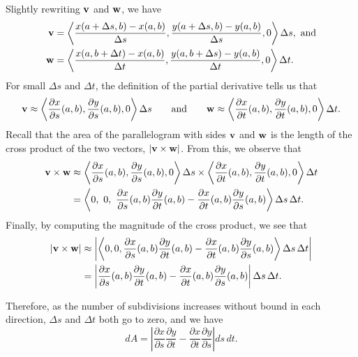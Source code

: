 Slightly rewriting $\mathbf{v}$ and $\mathbf{w}$, we have 
\begin{align*}
\vv &= \left\langle \frac{x(a+ \Delta s, b) - x(a,b)}{\Delta s}, \frac{y(a+ \Delta s, b) - y(a,b)}{\Delta s}, 0 \right\rangle \Delta s, \ \mbox{and} \\
\vw &= \left\langle \frac{x(a, b+ \Delta t) - x(a,b)}{\Delta t}, \frac{y(a, b+ \Delta s) - y(a,b)}{\Delta t}, 0 \right\rangle \Delta t.
\end{align*}
For small $\Delta s$ and $\Delta t$, the definition of the partial derivative tells us that
\[\mathbf{v} \approx \left\langle \frac{\partial x}{\partial s}(a,b), \frac{\partial y}{\partial s}(a,b), 0 \right\rangle \Delta s \ \ \ \ \ \text{ and } \ \ \ \ \  \mathbf{w} \approx \left\langle \frac{\partial x}{\partial t}(a,b), \frac{\partial y}{\partial t}(a,b), 0 \right\rangle \Delta t.\]
Recall that the area of the parallelogram with sides $\mathbf{v}$ and $\mathbf{w}$ is the length of the cross product of the two vectors, $|\mathbf{v} \times \mathbf{w}|$. From this, we observe that
\begin{align*}
\mathbf{v} \times \mathbf{w} &\approx \left\langle \frac{\partial x}{\partial s}(a,b), \frac{\partial y}{\partial s}(a,b), 0 \right\rangle \Delta s \times \left\langle \frac{\partial x}{\partial t}(a,b), \frac{\partial y}{\partial t}(a,b), 0 \right\rangle \Delta t \\
    &= \left\langle 0, \ 0, \ \frac{\partial x}{\partial s}(a,b) \frac{\partial y}{\partial t}(a,b) - \frac{\partial x}{\partial t}(a,b) \frac{\partial y}{\partial s}(a,b) \right\rangle \Delta s \, \Delta t.
\end{align*}
Finally, by computing the magnitude of the cross product, we see that
\begin{align*}
|\mathbf{v} \times \mathbf{w}| &\approx \left|\left\langle 0,0, \frac{\partial x}{\partial s}(a,b) \frac{\partial y}{\partial t}(a,b) - \frac{\partial x}{\partial t}(a,b) \frac{\partial y}{\partial s}(a,b) \right\rangle \Delta s \, \Delta t\right| \\
    &= \left|\frac{\partial x}{\partial s}(a,b) \frac{\partial y}{\partial t}(a,b) - \frac{\partial x}{\partial t}(a,b) \frac{\partial y}{\partial s}(a,b)\right| \Delta s \, \Delta t.
\end{align*}

Therefore, as the number of subdivisions increases without bound in each direction, $\Delta s$ and $\Delta t$ both go to zero, and we have
\begin{equation} \label{E:Area_Element}
dA = \left|\frac{\partial x}{\partial s} \frac{\partial y}{\partial t} - \frac{\partial x}{\partial t} \frac{\partial y}{\partial s} \right| ds \, dt.
\end{equation}

